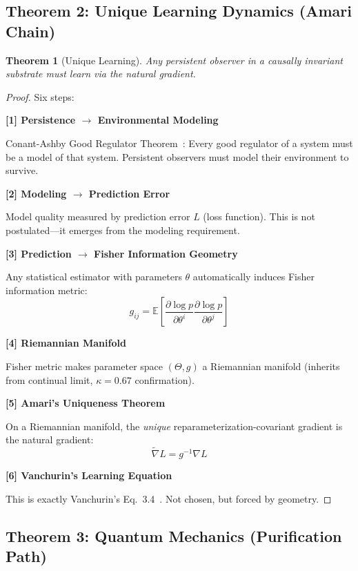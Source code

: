 \documentclass[11pt]{article}
\newtheorem{theorem}{Theorem}
\theoremstyle{definition}
\theoremstyle{remark}
\begin{document}
\subsection{Theorem 2: Unique Learning Dynamics (Amari Chain)}

\begin{theorem}[Unique Learning]
Any persistent observer in a causally invariant substrate must learn via the natural gradient.
\end{theorem}

\begin{proof}
Six steps:

\textbf{[1] Persistence $\to$ Environmental Modeling}

Conant-Ashby Good Regulator Theorem~\cite{ConantAshby1970}: Every good regulator of a system must be a model of that system. Persistent observers must model their environment to survive.

\textbf{[2] Modeling $\to$ Prediction Error}

Model quality measured by prediction error $L$ (loss function). This is not postulated---it emerges from the modeling requirement.

\textbf{[3] Prediction $\to$ Fisher Information Geometry}

Any statistical estimator with parameters $\theta$ automatically induces Fisher information metric:
\begin{equation}
g_{ij} = \mathbb{E}\left[\frac{\partial \log p}{\partial \theta^i}\frac{\partial \log p}{\partial \theta^j}\right]
\end{equation}

\textbf{[4] Riemannian Manifold}

Fisher metric makes parameter space $(\Theta, g)$ a Riemannian manifold (inherits from continual limit, $\kappa=0.67$ confirmation).

\textbf{[5] Amari's Uniqueness Theorem}~\cite{Amari1998}

On a Riemannian manifold, the \textit{unique} reparameterization-covariant gradient is the natural gradient:
\begin{equation}
\tilde{\nabla} L = g^{-1} \nabla L
\end{equation}

\textbf{[6] Vanchurin's Learning Equation}

This is exactly Vanchurin's Eq.~3.4~\cite{Vanchurin2025}. Not chosen, but forced by geometry.
\end{proof}

\subsection{Theorem 3: Quantum Mechanics (Purification Path)}
\end{document}
